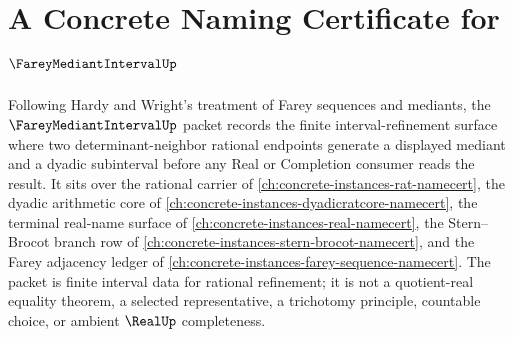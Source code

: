 \chapter{A Concrete Naming Certificate for $\FareyMediantIntervalUp$}
\label{ch:concrete-instances-farey-mediant-interval-namecert}

Following Hardy and Wright's treatment of Farey sequences and mediants, the $\FareyMediantIntervalUp$ packet records the finite interval-refinement surface where two determinant-neighbor rational endpoints generate a displayed mediant and a dyadic subinterval before any Real or Completion consumer reads the result. It sits over the rational carrier of \autoref{ch:concrete-instances-rat-namecert}, the dyadic arithmetic core of \autoref{ch:concrete-instances-dyadicratcore-namecert}, the terminal real-name surface of \autoref{ch:concrete-instances-real-namecert}, the Stern--Brocot branch row of \autoref{ch:concrete-instances-stern-brocot-namecert}, and the Farey adjacency ledger of \autoref{ch:concrete-instances-farey-sequence-namecert}. The packet is finite interval data for rational refinement; it is not a quotient-real equality theorem, a selected representative, a trichotomy principle, countable choice, or ambient $\RealUp$ completeness.


